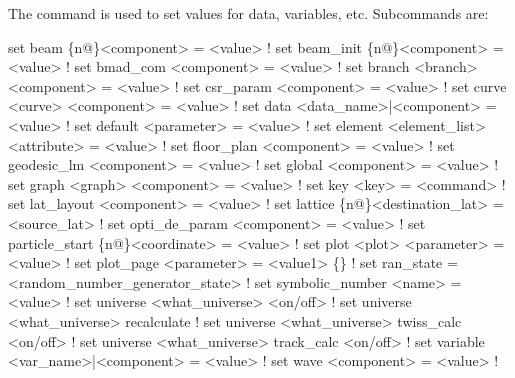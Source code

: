{{The  command is used to set values for data, variables, etc. Subcommands are:
\begin{example}
  set beam \{n@\}<component> = <value>                        ! 
  set beam_init \{n@\}<component> = <value>                   ! 
  set bmad_com <component> = <value>                        ! 
  set branch <branch> <component> = <value>                 ! 
  set csr_param <component> = <value>                       ! 
  set curve <curve> <component> = <value>                   ! 
  set data <data_name>|<component> = <value>                ! 
  set default <parameter> = <value>                         ! 
  set element <element_list> <attribute> = <value>          ! 
  set floor_plan <component> = <value>                      ! 
  set geodesic_lm <component> = <value>                     ! 
  set global <component> = <value>                          ! 
  set graph <graph> <component> = <value>                   ! 
  set key <key> = <command>                                 ! 
  set lat_layout <component> = <value>                      ! 
  set lattice \{n@\}<destination_lat> = <source_lat>          ! 
  set opti_de_param <component> = <value>                   ! 
  set particle_start \{n@\}<coordinate> = <value>             ! 
  set plot <plot> <parameter> = <value>                     ! 
  set plot_page <parameter> = <value1> \{<value2>\}           ! 
  set ran_state = <random_number_generator_state>           ! 
  set symbolic_number <name> = <value>                      ! 
  set universe <what_universe> <on/off>                     ! 
  set universe <what_universe> recalculate                  ! 
  set universe <what_universe> twiss_calc <on/off>          ! 
  set universe <what_universe> track_calc <on/off>          ! 
  set variable <var_name>|<component> = <value>             ! 
  set wave <component> = <value>                            ! 
\end{example}

\vskip 10pt 

}}
